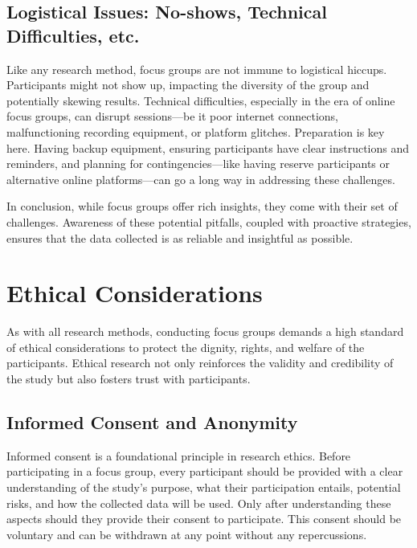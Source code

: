 \documentclass[
  b5paper]{book}
\begin{document}
\hypertarget{logistical-issues-no-shows-technical-difficulties-etc.}{%
\subsection*{Logistical Issues: No-shows, Technical Difficulties, etc.}\label{logistical-issues-no-shows-technical-difficulties-etc.}}

Like any research method, focus groups are not immune to logistical hiccups. Participants might not show up, impacting the diversity of the group and potentially skewing results. Technical difficulties, especially in the era of online focus groups, can disrupt sessions---be it poor internet connections, malfunctioning recording equipment, or platform glitches. Preparation is key here. Having backup equipment, ensuring participants have clear instructions and reminders, and planning for contingencies---like having reserve participants or alternative online platforms---can go a long way in addressing these challenges.

In conclusion, while focus groups offer rich insights, they come with their set of challenges. Awareness of these potential pitfalls, coupled with proactive strategies, ensures that the data collected is as reliable and insightful as possible.

\hypertarget{ethical-considerations-1}{%
\section{Ethical Considerations}\label{ethical-considerations-1}}

As with all research methods, conducting focus groups demands a high standard of ethical considerations to protect the dignity, rights, and welfare of the participants. Ethical research not only reinforces the validity and credibility of the study but also fosters trust with participants.

\hypertarget{informed-consent-and-anonymity}{%
\subsection*{Informed Consent and Anonymity}\label{informed-consent-and-anonymity}}

Informed consent is a foundational principle in research ethics. Before participating in a focus group, every participant should be provided with a clear understanding of the study's purpose, what their participation entails, potential risks, and how the collected data will be used. Only after understanding these aspects should they provide their consent to participate. This consent should be voluntary and can be withdrawn at any point without any repercussions.
\end{document}
